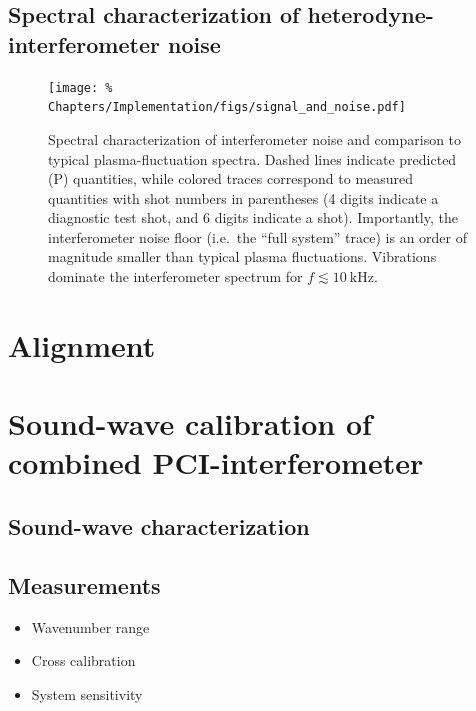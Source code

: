 \subsection{Spectral characterization of heterodyne-interferometer noise}
\label{sec:Implementation:Noise:interferometer}
\begin{figure}
  \centering
  \texttt{[image: \%
    Chapters/Implementation/figs/signal\_and\_noise.pdf]}
  \caption[Spectral characterization of interferometer noise]{%
    Spectral characterization of interferometer noise and
    comparison to typical plasma-fluctuation spectra.
    Dashed lines indicate predicted (P) quantities, while
    colored traces correspond to measured quantities
    with shot numbers in parentheses
    (4 digits indicate a diagnostic test shot, and
    6 digits indicate a \diiid\space shot).
    Importantly, the interferometer noise floor
    (i.e.\ the ``full system'' trace)
    is an order of magnitude smaller than
    typical plasma fluctuations.
    Vibrations dominate the interferometer spectrum
    for $f \lesssim \SI{10}{\kilo\hertz}$.
  }
\label{fig:Implementation:signal_and_noise}
\end{figure}


\section{Alignment}
\label{sec:Implementation:Alignment}
\section{Sound-wave calibration of combined PCI-interferometer}
\subsection{Sound-wave characterization}
\subsection{Measurements}
\begin{itemize}
  \item Wavenumber range
  \item Cross calibration
  \item System sensitivity
\end{itemize}


